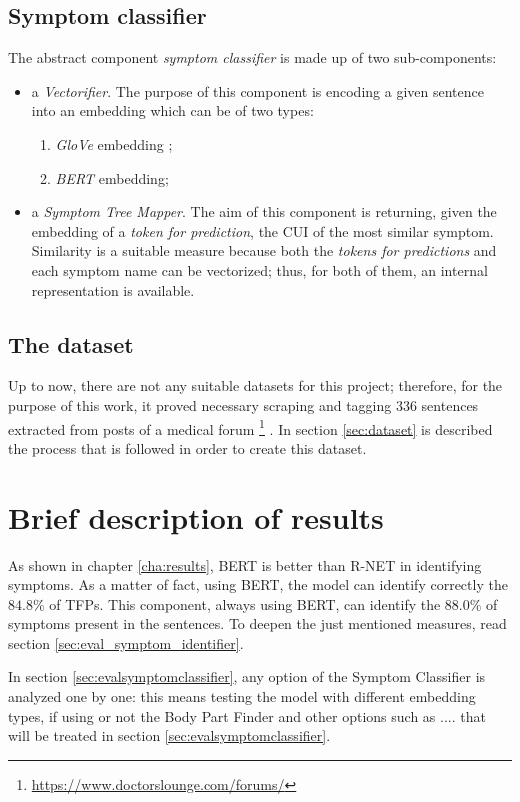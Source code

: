 \subsection*{Symptom classifier}
The abstract component \textit{symptom classifier} is made up of two sub-components:
\begin{itemize}
  \item a \textit{Vectorifier}. The purpose of this component is encoding a given sentence into an embedding which can be of two types:
  \begin{enumerate}
    \item \textit{GloVe} embedding \cite{glove};
    \item \textit{BERT} embedding;
  \end{enumerate}
  \item a \textit{Symptom Tree Mapper}. The aim of this component is returning, given the embedding of a \textit{token for prediction}, the CUI of the most similar symptom. Similarity is a suitable measure because both the \textit{tokens for predictions} and each symptom name can be vectorized; thus, for both of them, an internal representation is available.
\end{itemize}

\subsection*{The dataset}
\label{datasetintro}
Up to now, there are not any suitable datasets for this project; therefore, for the purpose of this work, it proved necessary scraping and tagging $336$ sentences extracted from posts of a medical forum \footnote{\url{https://www.doctorslounge.com/forums/}} \cite{doctorslounge}. In section \ref{sec:dataset} is described the process that is followed in order to create this dataset.

\section{Brief description of results}
\label{sec:brief_results}
As shown in chapter \ref{cha:results}, BERT is better than R-NET in identifying symptoms. As a matter of fact, using BERT, the model can identify correctly the $84.8 \%$ of TFPs. This component, always using BERT, can identify the $88.0 \%$ of symptoms present in the sentences. To deepen the just mentioned measures, read section \ref{sec:eval_symptom_identifier}.

In section \ref{sec:evalsymptomclassifier}, any option of the Symptom Classifier is analyzed one by one: this means testing the model with different embedding types, if using or not the Body Part Finder and other options such as .... that will be treated in section \ref{sec:evalsymptomclassifier}.
